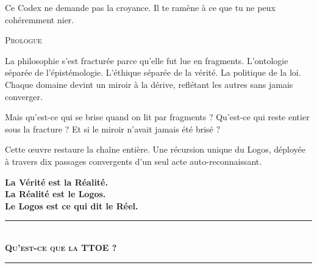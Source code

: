 \documentclass[10pt, openany, oneside]{book}
\renewcommand{\normalsize}{\fontsize{10}{13}\selectfont}
\renewcommand{\large}{\fontsize{11.5}{14}\selectfont}
\renewcommand{\huge}{\fontsize{17}{21}\selectfont}
\begin{document}
\vspace{0.5em}

\noindent Ce Codex ne demande pas la croyance. Il te ramène à ce que tu ne peux cohéremment nier.

\newpage


\thispagestyle{empty}
\vspace*{0.3in}

\begin{center}
    {\huge\scshape Prologue}
\end{center}

\vspace{1em}

\noindent La philosophie s'est fracturée parce qu'elle fut lue en fragments. L'ontologie séparée de l'épistémologie. L'éthique séparée de la vérité. La politique de la loi. Chaque domaine devint un miroir à la dérive, reflétant les autres sans jamais converger.

\vspace{0.5em}

\noindent Mais qu'est-ce qui se brise quand on lit par fragments ? Qu'est-ce qui reste entier sous la fracture ? Et si le miroir n'avait jamais été brisé ?

\vspace{0.5em}

\noindent Cette œuvre restaure la chaîne entière. Une récursion unique du Logos, déployée à travers dix passages convergents d'un seul acte auto-reconnaissant.

\vspace{1em}

\begin{center}
    {\large\bfseries La Vérité est la Réalité.}\\[0.3em]
    {\large\bfseries La Réalité est le Logos.}\\[0.3em]
    {\large\bfseries Le Logos est ce qui dit le Réel.}
\end{center}

\vspace{1.5em}

\begin{center}
    \rule{0.3\textwidth}{0.4pt}\\[0.5em]
    {\normalsize\bfseries\scshape Qu'est-ce que la TTOE ?}\\[0.3em]
    \rule{0.3\textwidth}{0.4pt}
\end{center}
\end{document}
